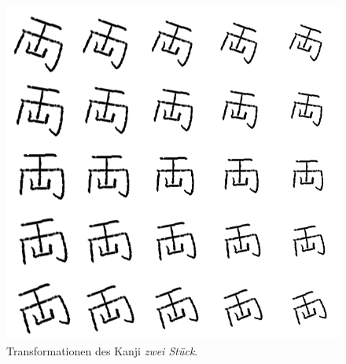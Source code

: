 \documentclass[twoside,a4paper]{IEEEtran}
\begin{document}
\begin{figure}[!htb]
	\includegraphics[width=\columnwidth]{rot_scale}
	\caption{Transformationen des Kanji \textit{zwei Stück}.}
	\label{rot}
\end{figure}
\end{document}
